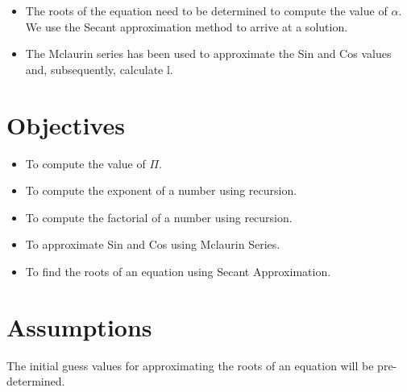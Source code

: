 \documentclass{report}
\begin{document}
  \begin{itemize}
    \item {The roots of the equation need to be determined to compute the value of $\alpha$. We use the Secant approximation method to arrive at a solution.}
    \item {The Mclaurin series has been used to approximate the Sin and Cos values and, subsequently, calculate l.}
  \end{itemize}

\section{Objectives}
\begin{itemize}
  \item To compute the value of $\Pi$.
  \item To compute the exponent of a number using recursion.
  \item To compute the factorial of a number using recursion.
  \item To approximate Sin and Cos using Mclaurin Series.
  \item To find the roots of an equation using Secant Approximation.
\end{itemize}

\section{Assumptions}
  The initial guess values for approximating the roots of an equation will be pre-determined.
\end{document}
